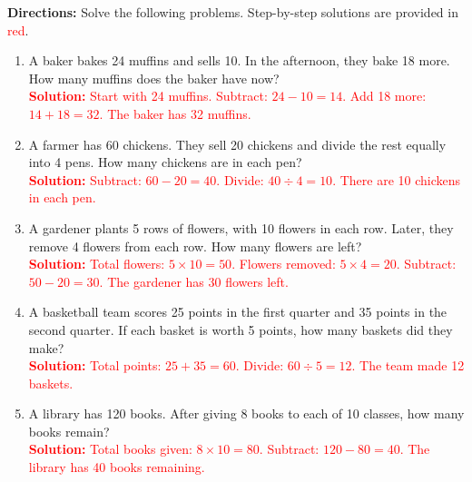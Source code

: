 \documentclass[11pt]{article}
\begin{document}
\vspace{1em}

\begin{tcolorbox}[colframe=black!60, colback=white, 
coltitle=black, colbacktitle=black!15, fonttitle=\bfseries\Large, 
title=Problems, halign title=center, left=10pt, right=10pt, top=10pt, bottom=60pt]
\textbf{Directions:} Solve the following problems. Step-by-step solutions are provided in \textcolor{red}{red}.

\begin{enumerate}[start=6, itemsep=3em]
    \item A baker bakes 24 muffins and sells 10. In the afternoon, they bake 18 more. How many muffins does the baker have now?\\
    \textcolor{red}{\textbf{Solution:} Start with 24 muffins. Subtract: \(24 - 10 = 14\). Add 18 more: \(14 + 18 = 32\). The baker has 32 muffins.}
    
    \item A farmer has 60 chickens. They sell 20 chickens and divide the rest equally into 4 pens. How many chickens are in each pen?\\
    \textcolor{red}{\textbf{Solution:} Subtract: \(60 - 20 = 40\). Divide: \(40 \div 4 = 10\). There are 10 chickens in each pen.}
    
    \item A gardener plants 5 rows of flowers, with 10 flowers in each row. Later, they remove 4 flowers from each row. How many flowers are left?\\
    \textcolor{red}{\textbf{Solution:} Total flowers: \(5 \times 10 = 50\). Flowers removed: \(5 \times 4 = 20\). Subtract: \(50 - 20 = 30\). The gardener has 30 flowers left.}
    
    \item A basketball team scores 25 points in the first quarter and 35 points in the second quarter. If each basket is worth 5 points, how many baskets did they make?\\
    \textcolor{red}{\textbf{Solution:} Total points: \(25 + 35 = 60\). Divide: \(60 \div 5 = 12\). The team made 12 baskets.}
    
    \item A library has 120 books. After giving 8 books to each of 10 classes, how many books remain?\\
    \textcolor{red}{\textbf{Solution:} Total books given: \(8 \times 10 = 80\). Subtract: \(120 - 80 = 40\). The library has 40 books remaining.}
\end{enumerate}
\end{tcolorbox}
\end{document}
